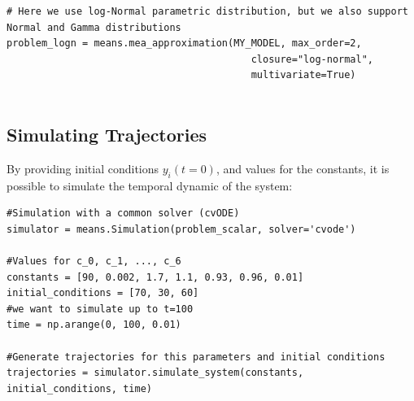 \begin{framed}
\begin{verbatim}
# Here we use log-Normal parametric distribution, but we also support Normal and Gamma distributions
problem_logn = means.mea_approximation(MY_MODEL, max_order=2,
                                          closure="log-normal",
                                          multivariate=True)
                                          
\end{verbatim}
\end{framed}

\subsection{Simulating Trajectories}
By providing initial conditions $y_i(t=0)$, and values for the constants, it is possible to simulate the temporal dynamic of the system:



\begin{framed}
\begin{verbatim}
#Simulation with a common solver (cvODE)
simulator = means.Simulation(problem_scalar, solver='cvode')

#Values for c_0, c_1, ..., c_6
constants = [90, 0.002, 1.7, 1.1, 0.93, 0.96, 0.01]
initial_conditions = [70, 30, 60]
#we want to simulate up to t=100
time = np.arange(0, 100, 0.01)

#Generate trajectories for this parameters and initial conditions
trajectories = simulator.simulate_system(constants, initial_conditions, time)
\end{verbatim}
\end{framed}

